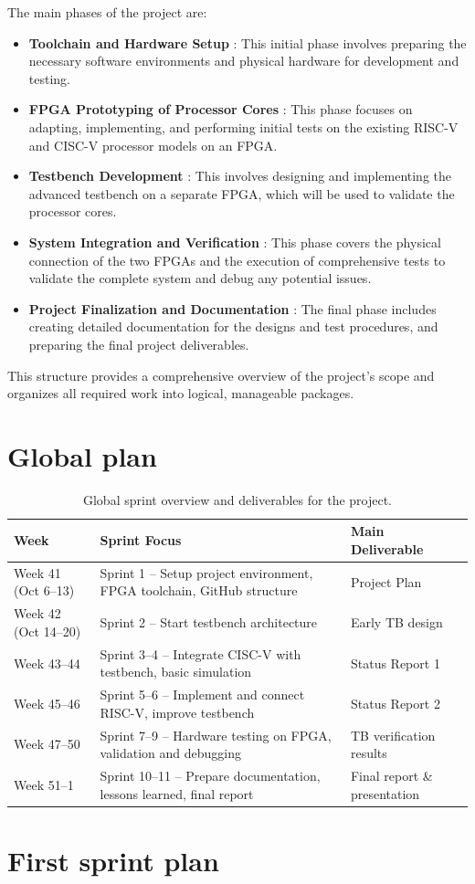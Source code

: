 \documentclass[10pt]{article}
\begin{document}
The main phases of the project are:
\begin{itemize}
  \item \textbf{Toolchain and Hardware Setup} : This initial phase involves preparing the necessary software environments and physical hardware for development and testing.
  \item \textbf{FPGA Prototyping of Processor Cores} : This phase focuses on adapting, implementing, and performing initial tests on the existing RISC-V and CISC-V processor models on an FPGA.
  \item \textbf{Testbench Development} : This involves designing and implementing the advanced testbench on a separate FPGA, which will be used to validate the processor cores.
  \item \textbf{System Integration and Verification} : This phase covers the physical connection of the two FPGAs and the execution of comprehensive tests to validate the complete system and debug any potential issues.
  \item \textbf{Project Finalization and Documentation} : The final phase includes creating detailed documentation for the designs and test procedures, and preparing the final project deliverables.
\end{itemize}
This structure provides a comprehensive overview of the project's scope and organizes all required work into logical, manageable packages.


\section{Global plan}

\begin{table}[h!]
\centering
\begin{tabular}{|l|l|l|}
\hline
\textbf{Week} & \textbf{Sprint Focus} & \textbf{Main Deliverable} \\ \hline
Week 41 (Oct 6–13) & Sprint 1 – Setup project environment, FPGA toolchain, GitHub structure & Project Plan \\ \hline
Week 42 (Oct 14–20) & Sprint 2 – Start testbench architecture & Early TB design \\ \hline
Week 43–44 & Sprint 3–4 – Integrate CISC-V with testbench, basic simulation & Status Report 1 \\ \hline
Week 45–46 & Sprint 5–6 – Implement and connect RISC-V, improve testbench & Status Report 2 \\ \hline
Week 47–50 & Sprint 7–9 – Hardware testing on FPGA, validation and debugging & TB verification results \\ \hline
Week 51–1 & Sprint 10–11 – Prepare documentation, lessons learned, final report & Final report \& presentation \\ \hline
\end{tabular}
\caption{Global sprint overview and deliverables for the project.}
\label{tab:sprint_overview}
\end{table}


\section{First sprint plan}
\end{document}
